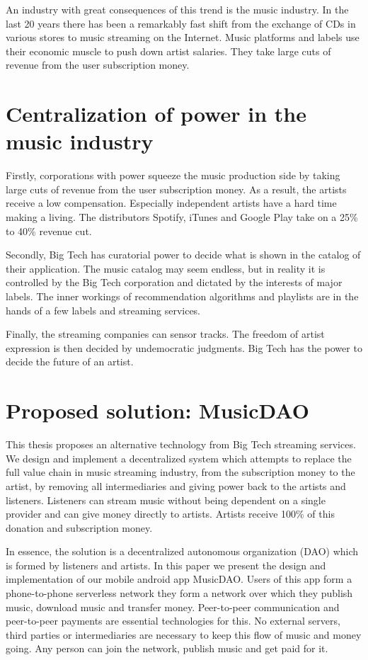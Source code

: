 An industry with great consequences of this trend is the music industry. In the last 20 years there has been a remarkably fast shift from the exchange of CDs in various stores to music streaming on the Internet. Music platforms and labels use their economic muscle to push down artist salaries. They take large cuts of revenue from the user subscription money.

\section{Centralization of power in the music industry}
Firstly, corporations with power squeeze the music production side by taking large cuts of revenue from the user subscription money. As a result, the artists receive a low compensation. Especially independent artists have a hard time making a living. The distributors Spotify, iTunes and Google Play take on a 25\% to 40\% revenue cut.

Secondly, Big Tech has curatorial power to decide what is shown in the catalog of their application. The music catalog may seem endless, but in reality it is controlled by the Big Tech corporation and dictated by the interests of major labels. The inner workings of recommendation algorithms and playlists are in the hands of a few labels and streaming services.

Finally, the streaming companies can sensor tracks. The freedom of artist expression is then decided by undemocratic judgments. Big Tech has the power to decide the future of an artist.

\section{Proposed solution: MusicDAO}
This thesis proposes an alternative technology from Big Tech streaming services. We design and implement a decentralized system which attempts to replace the full value chain in music streaming industry, from the subscription money to the artist, by removing all intermediaries and giving power back to the artists and listeners. Listeners can stream music without being dependent on a single provider and can give money directly to artists. Artists receive 100\% of this donation and subscription money.

In essence, the solution is a decentralized autonomous organization (DAO) which is formed by listeners and artists. In this paper we present the design and implementation of our mobile android app MusicDAO. Users of this app form a phone-to-phone serverless network they form a network over which they publish music, download music and transfer money. Peer-to-peer communication and peer-to-peer payments are essential technologies for this. No external servers, third parties or intermediaries are necessary to keep this flow of music and money going. Any person can join the network, publish music and get paid for it. 

